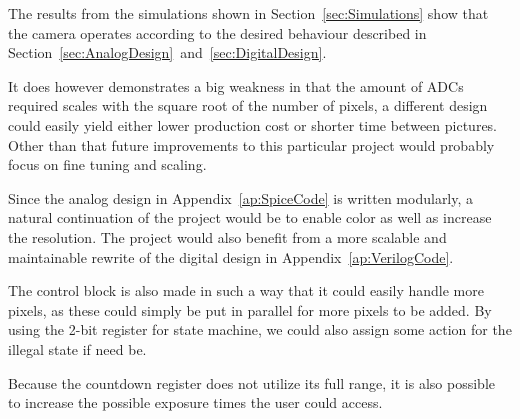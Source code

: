 The results from the simulations shown in Section~\ref{sec:Simulations} show that the camera
operates according to the desired behaviour described in Section~\ref{sec:AnalogDesign}~and~\ref{sec:DigitalDesign}.

It does however demonstrates a big weakness in that the amount of ADCs required scales with
the square root of the number of pixels, a different design could easily yield either
lower production cost or shorter time between pictures.
Other than that future improvements to this particular project would probably focus on fine tuning and scaling.

Since the analog design in Appendix~\ref{ap:SpiceCode} is written modularly, a natural continuation of the project would be to enable color as well as increase the resolution.
The project would also benefit from a more scalable and maintainable rewrite of the digital design in Appendix~\ref{ap:VerilogCode}.

The control block is also made in such a way that it could easily handle more pixels, as these could simply be put in parallel for more pixels to be added. By using the 2-bit register for state machine, we could also assign some action for the illegal state if need be. 

Because the countdown register does not utilize its full range, it is also possible to increase the possible exposure times the user could access.
